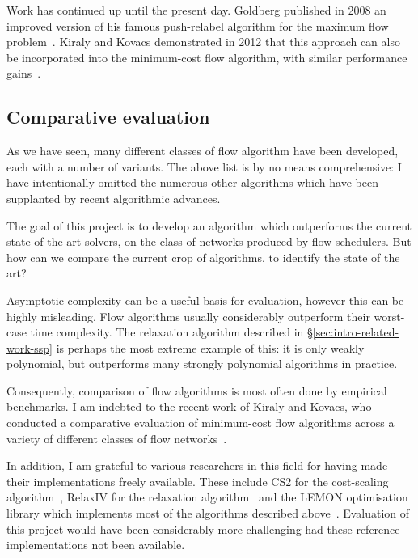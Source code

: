 Work has continued up until the present day. Goldberg published in 2008 an improved version of his famous push-relabel algorithm for the maximum flow problem~\cite{Goldberg:2008}. Kiraly and Kovacs demonstrated in 2012 that this approach can also be incorporated into the minimum-cost flow algorithm, with similar performance gains~\cite{KiralyKovacs:2012}.

\subsection{Comparative evaluation}

As we have seen, many different classes of flow algorithm have been developed, each with a number of variants. The above list is by no means comprehensive: I have intentionally omitted the numerous other algorithms which have been supplanted by recent algorithmic advances.

The goal of this project is to develop an algorithm which outperforms the current state of the art solvers, on the class of networks produced by flow schedulers. But how can we compare the current crop of algorithms, to identify the state of the art? 

Asymptotic complexity can be a useful basis for evaluation, however this can be highly misleading. Flow algorithms usually considerably outperform their worst-case time complexity. The relaxation algorithm described in \S\ref{sec:intro-related-work-ssp} is perhaps the most extreme example of this: it is only weakly polynomial, but outperforms many strongly polynomial algorithms in practice.

Consequently, comparison of flow algorithms is most often done by empirical benchmarks. I am indebted to the recent work of Kiraly and Kovacs, who conducted a comparative evaluation of minimum-cost flow algorithms across a variety of different classes of flow networks~\cite{KiralyKovacs:2012,Kovacs:2015}.

In addition, I am grateful to various researchers in this field for having made their implementations freely available. These include CS2 for the cost-scaling algorithm~\cite{CS2:2009}, RelaxIV for the relaxation algorithm~\cite{RelaxIV:2011} and the LEMON optimisation library which implements most of the algorithms described above~\cite{LEMON:2011,LEMON:Software}. Evaluation of this project would have been considerably more challenging had these reference implementations not been available.

